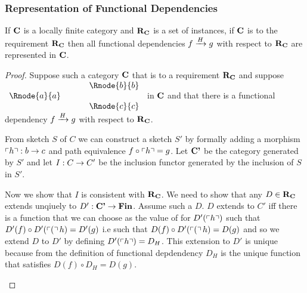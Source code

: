 \subsubsection{Representation of Functional Dependencies}
\begin{lemma}
If $\catc$ is a locally finite category and $\reqtc$ is a set of instances, if $\catc$ is 
 to the requirement $\reqtc$ then
all functional dependencies $\fundep{H}{f}{g}$  with respect to $\reqtc$ are represented in $\catc$.
\end{lemma}
\begin{proof}
Suppose such a category  $\catc$  that  is 
 to a requirement $\reqtc$ and suppose
$
\begin{array}{c p{0.5cm} c  }
             &&   \Rnode{b}{b} \\[0.01cm]
\Rnode{a}{a} &&                \\[0.01cm] 
             &&   \Rnode{c}{c}         
\end{array} 
$
in $\catc$ 
and that there is a functional dependency $\fundep{H}{f}{g}$ with respect to $\reqtc$.

From sketch $S$ of $C$ we can construct a sketch $S'$ by formally adding a morphism $\qq{h}: b \morph c$
and path equivalence $f \circ \qq{h} = g$. Let $\catcp$ be the category generated by $S'$ and
let $I: C \morph C'$ be the inclusion functor generated by the inclusion of $S$ in $S'$. 

\begin{newtt}
Now we show that $I$ is consistent with $\reqtc$. 
We need to show that any $D \in \reqtc$
extends unqiuely to $D' :\catcp \morph \Fin$. Assume such a $D$. 
$D$  extends to $C'$ iff there is a  function that we can choose as the value of  for $D'(\qq{h})$  such that $D'(f) \circ D'(\qq(h) = D'(g)$ i.e such that
$D(f) \circ D'(\qq(h) = D(g)$ and so we  extend $D$ to $D'$ 
 by defining $D'(\qq{h})=D_H$.
This extension to $D'$ is unique because from the definition of functional depdendency
$D_H$ is the unique function that satisfies $D(f) \circ D_H = D(g)$.
\end{newtt}


\end{proof}
